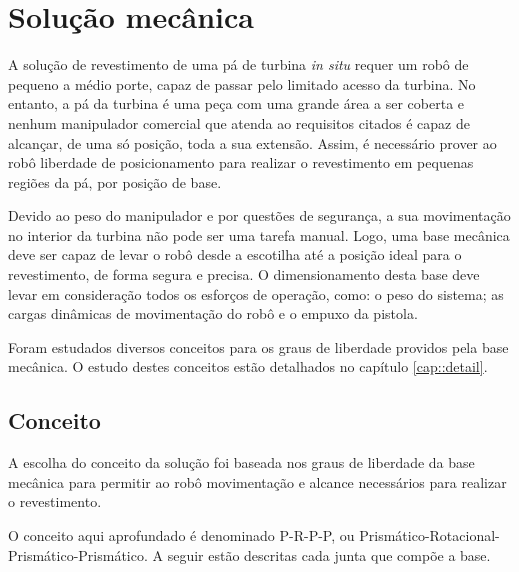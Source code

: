 \section{Solução mecânica}

A solução de revestimento de uma pá de turbina \textit{in situ} requer um robô
de pequeno a médio porte, capaz de passar pelo limitado acesso da turbina. 
No entanto, a pá da turbina é uma peça com uma grande área a ser coberta e
nenhum manipulador comercial que atenda ao requisitos citados é capaz de
alcançar, de uma só posição, toda a sua extensão.
Assim, é necessário prover ao robô liberdade de posicionamento para realizar o
revestimento em pequenas regiões da pá, por posição de base.

Devido ao peso do manipulador e por questões de segurança, a sua movimentação no
interior da turbina não pode ser uma tarefa manual. Logo, uma base mecânica deve
ser capaz de levar o robô desde a escotilha até a posição ideal para o
revestimento, de forma segura e precisa. O dimensionamento desta base deve levar
em consideração todos os esforços de operação, como: o peso do sistema; as
cargas dinâmicas de movimentação do robô e o empuxo da pistola.

Foram estudados diversos conceitos para os graus de liberdade providos pela
base mecânica. O estudo destes conceitos estão detalhados no capítulo
\ref{cap::detail}.

\subsection{Conceito}

A escolha do conceito da solução foi baseada nos graus de liberdade da base
mecânica para permitir ao robô movimentação e alcance necessários para realizar 
o revestimento. 

O conceito aqui aprofundado é denominado P-R-P-P, ou
Prismático-Rotacional-Prismático-Prismático.
A seguir estão descritas cada junta que compõe a base.

